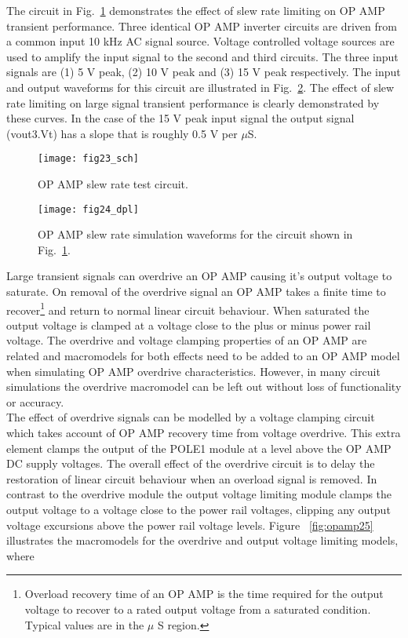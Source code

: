 The circuit in Fig.~\ref{fig:opamp23} demonstrates the effect of slew rate limiting on OP AMP transient performance. Three identical OP AMP inverter circuits are driven from a common input 10 kHz AC signal source. Voltage controlled voltage sources are used to amplify the input signal to the second and third circuits.  The three input signals are (1) 5 V peak, (2) 10 V peak and (3) 15 V peak respectively.  The input and output waveforms for this circuit are illustrated in Fig.~\ref{fig:opamp24}. The effect of slew rate limiting on large signal transient performance is clearly demonstrated by these curves. In the case of the 15 V peak input signal the output signal (vout3.Vt) has a slope that is roughly 0.5 V per $\mu$S. 

\begin{figure}
  \centering
  \texttt{[image: fig23\_sch]}
  \caption{OP AMP slew rate test circuit.}
  \label{fig:opamp23}
\end{figure}

\begin{figure}
  \centering
  \texttt{[image: fig24\_dpl]}
  \caption{OP AMP slew rate simulation waveforms for the circuit shown in Fig.~\ref{fig:opamp23}.}
  \label{fig:opamp24}
\end{figure}


Large transient signals can overdrive an OP AMP causing it's output voltage to saturate. On removal of the overdrive signal an OP AMP takes a finite time to recover\footnote{Overload recovery time of an OP AMP is the time required for the output voltage to recover to a rated output voltage from a saturated condition. Typical values are in the $\mu$ S region.} and return to normal linear circuit behaviour.  When saturated the output voltage is clamped at a voltage close to the plus or minus power rail voltage.  The overdrive and voltage clamping properties of an OP AMP are related and macromodels for both effects need to be added to an OP AMP model when simulating OP AMP overdrive characteristics.  However, in many circuit simulations the overdrive macromodel can be left out without loss of functionality or accuracy.\\

The effect of overdrive signals can be modelled by a voltage clamping circuit which takes account of OP AMP recovery time from voltage overdrive. This extra element clamps the output of the POLE1 module at a level above the OP AMP DC supply voltages. The overall effect of the overdrive circuit is to delay the restoration of linear circuit behaviour when an overload signal is removed.  In contrast to the overdrive module the output voltage limiting module clamps the output voltage to a voltage close to the power rail voltages, clipping any output voltage excursions above the power rail voltage levels. Figure ~\ref{fig:opamp25} illustrates the macromodels for the overdrive and output voltage limiting models, where

